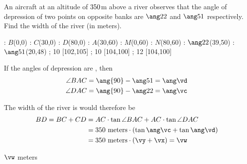 

\va\vc
{}\vb\vd
\DEGREESTAN\vc\vm
\DEGREESTAN\vd\vn
\ROUND[2]\vm\vx
\ROUND[2]\vn\vy
\ADD\vx\vy\vz
\MULTIPLY\vh\vz\vv
\ROUND[2]\vv\vw

\question[2] An aircraft at an altitude of $350$m above a river observes that the angle 
of depression of two points on opposite banks are $\ang\va$ and $\ang\vb$ respectively.
Find the width of the river (in meters).

\watchout
{}

\ifprintanswers
  \begin{marginfigure}
      : $B$(0,0)
      : $C$(30,0)
      : $D$(80,0)
      : $A$(30,60)
      : $M$(0,60)
      : $N$(80,60)
      : $\ang\va$(39,50) %
      : $\ang\vb$(20,48)
    \figdrawbegin{}
      \figdrawline [100,103,102,101,100]
      \figdrawline [103,101]
      \figdrawline [104,105]
       ; 10 [102,105] 
       ; 10 [104,100] 
       ; 12 [104,100] 
    \figdrawend
    \centerline{\box\figBoxA}
  \end{marginfigure}
\fi 

\begin{solution}[\halfpage]
  If the angles of depression are \asif, then 
    \begin{align}
      \angle{BAC} &= \ang{90} - \ang\vb=\ang\vd \\
      \angle{DAC} &= \ang{90} - \ang\va = \ang\vc
    \end{align}

  The width of the river is would therefore be
  \begin{align}
  	BD = BC + CD &= AC\cdot\tan\angle{BAC} + AC\cdot\tan\angle{DAC} \\
  	  &= \vh\text{ meters}\cdot\left( \tan\ang\vc + \tan\ang\vd \right) \\
  	  &= \vh\text{ meters}\cdot(\vy + \vx) = \vw
  \end{align}
\end{solution}

\ifprintanswers\begin{codex}$\vw$ meters\end{codex}\fi
